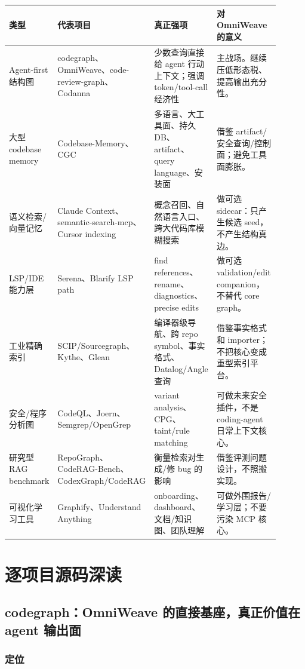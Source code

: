 \documentclass[11pt,a4paper]{article}
\begin{document}
\begin{longtable}{p{0.18\linewidth}p{0.22\linewidth}p{0.24\linewidth}p{0.26\linewidth}}
\toprule
类型 & 代表项目 & 真正强项 & 对 OmniWeave 的意义 \\
\midrule
\endhead
Agent-first 结构图 & codegraph、OmniWeave、code-review-graph、Codanna & 少数查询直接给 agent 行动上下文；强调 token/tool-call 经济性 & 主战场。继续压低形态税、提高输出充分性。 \\
大型 codebase memory & Codebase-Memory、CGC & 多语言、大工具面、持久 DB、artifact、query language、安装面 & 借鉴 artifact/安全查询/控制面；避免工具面膨胀。 \\
语义检索/向量记忆 & Claude Context、semantic-search-mcp、Cursor indexing & 概念召回、自然语言入口、跨大代码库模糊搜索 & 做可选 sidecar：只产生候选 seed，不产生结构真边。 \\
LSP/IDE 能力层 & Serena、Blarify LSP path & find references、rename、diagnostics、precise edits & 做可选 validation/edit companion，不替代 core graph。 \\
工业精确索引 & SCIP/Sourcegraph、Kythe、Glean & 编译器级导航、跨 repo symbol、事实格式、Datalog/Angle 查询 & 借鉴事实格式和 importer；不把核心变成重型索引平台。 \\
安全/程序分析图 & CodeQL、Joern、Semgrep/OpenGrep & variant analysis、CPG、taint/rule matching & 可做未来安全插件，不是 coding-agent 日常上下文核心。 \\
研究型 RAG benchmark & RepoGraph、CodeRAG-Bench、CodexGraph/CodeRAG & 衡量检索对生成/修 bug 的影响 & 借鉴评测问题设计，不照搬实现。 \\
可视化学习工具 & Graphify、Understand Anything & onboarding、dashboard、文档/知识图、团队理解 & 可做外围报告/学习层；不要污染 MCP 核心。 \\
\bottomrule
\end{longtable}

\section{逐项目源码深读}

\subsection{codegraph：OmniWeave 的直接基座，真正价值在 agent 输出面}

\subsubsection{定位}
\end{document}
